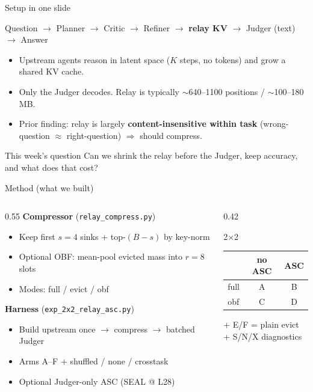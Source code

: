 \documentclass[aspectratio=169]{beamer}
\begin{document}
\begin{frame}{Setup in one slide}
\begin{center}
\small Question $\to$ Planner $\to$ Critic $\to$ Refiner $\to$
\textbf{relay KV} $\to$ Judger (text) $\to$ Answer
\end{center}
\begin{itemize}
  \item Upstream agents reason in latent space ($K$ steps, no tokens) and grow a shared KV cache.
  \item Only the Judger decodes. Relay is typically $\sim$640--1100 positions / $\sim$100--180\,MB.
  \item Prior finding: relay is largely \textbf{content-insensitive within task} (wrong-question $\approx$ right-question) $\Rightarrow$ should compress.
\end{itemize}
\begin{block}{This week's question}
Can we shrink the relay before the Judger, keep accuracy, and what does that cost?
\end{block}
\end{frame}

\begin{frame}{Method (what we built)}
\begin{columns}[T]
\begin{column}{0.55\textwidth}
\textbf{Compressor} (\texttt{relay\_compress.py})
\begin{itemize}\small
  \item Keep first $s{=}4$ sinks + top-$(B{-}s)$ by key-norm
  \item Optional OBF: mean-pool evicted mass into $r{=}8$ slots
  \item Modes: full / evict / obf
\end{itemize}
\vspace{0.3em}
\textbf{Harness} (\texttt{exp\_2x2\_relay\_asc.py})
\begin{itemize}\small
  \item Build upstream once $\to$ compress $\to$ batched Judger
  \item Arms A--F + shuffled / none / crosstask
  \item Optional Judger-only ASC (SEAL @ L28)
\end{itemize}
\end{column}
\begin{column}{0.42\textwidth}
\begin{block}{2$\times$2}
\centering\small
\begin{tabular}{lcc}
\toprule
 & no ASC & ASC \\
\midrule
full & A & B \\
obf & C & D \\
\bottomrule
\end{tabular}
\end{block}
\vspace{0.4em}
\footnotesize + E/F = plain evict\\
+ S/N/X diagnostics
\end{column}
\end{columns}
\end{frame}
\end{document}
